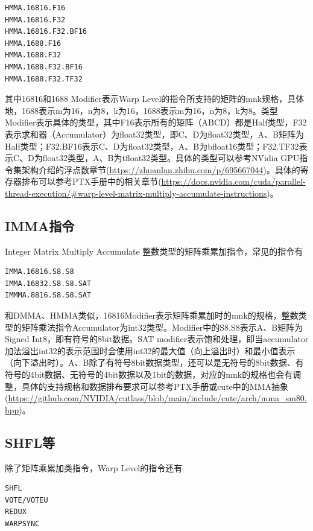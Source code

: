 \begin{lstlisting}
HMMA.16816.F16
HMMA.16816.F32
HMMA.16816.F32.BF16
HMMA.1688.F16
HMMA.1688.F32
HMMA.1688.F32.BF16
HMMA.1688.F32.TF32
\end{lstlisting}

其中16816和1688 Modifier表示Warp Level的指令所支持的矩阵的mnk规格，具体地，1688表示m为16，n为8，k为16，1688表示m为16，n为8，k为8。类型Modifier表示具体的类型，其中F16表示所有的矩阵（ABCD）都是Half类型，F32表示求和器（Accumulator）为float32类型，即C、D为float32类型，A、B矩阵为Half类型；F32.BF16表示C、D为float32类型，A、B为bfloat16类型；F32.TF32表示C、D为float32类型，A、B为tfloat32类型。具体的类型可以参考NVidia GPU指令集架构介绍的浮点数章节(\url{https://zhuanlan.zhihu.com/p/695667044})。具体的寄存器排布可以参考PTX手册中的相关章节(\url{https://docs.nvidia.com/cuda/parallel-thread-execution/#warp-level-matrix-multiply-accumulate-instructions})。

\subsection{IMMA指令}

Integer Matrix Multiply Accumulate 整数类型的矩阵乘累加指令，常见的指令有

\begin{lstlisting}
IMMA.16816.S8.S8
IMMA.16832.S8.S8.SAT
IMMMA.8816.S8.S8.SAT
\end{lstlisting}

和DMMA、HMMA类似，16816Modifier表示矩阵乘累加时的mnk的规格，整数类型的矩阵乘法指令Accumulator为int32类型。Modifier中的S8.S8表示A、B矩阵为Signed Int8，即有符号的8bit数据。SAT modifier表示饱和处理，即当accumulator加法溢出int32的表示范围时会使用int32的最大值（向上溢出时）和最小值表示（向下溢出时）。A、B除了有符号8bit数据类型，还可以是无符号的8bit数据、有符号的4bit数据、无符号的4bit数据以及1bit的数据，对应的mnk的规格也会有调整，具体的支持规格和数据排布要求可以参考PTX手册或cute中的MMA抽象(\url{https://github.com/NVIDIA/cutlass/blob/main/include/cute/arch/mma_sm80.hpp})。

\subsection{SHFL等}

除了矩阵乘累加类指令，Warp Level的指令还有

\begin{lstlisting}
SHFL
VOTE/VOTEU
REDUX
WARPSYNC
\end{lstlisting}


